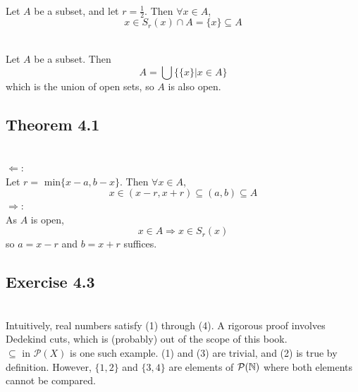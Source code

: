 \begin{solution}
 \\Let $A$ be a subset, and let $r = \frac{1}{2}$. Then $\forall x \in A$,
 $$x \in S_r(x) \cap A = \{x\} \subseteq A$$
\end{solution}


\begin{solution}
 \\Let $A$ be a subset. Then
 $$A = \bigcup\{\{x\}|x \in A\}$$
 which is the union of open sets, so $A$ is also open.
\end{solution}

\subsection{Theorem 4.1}


\begin{solution}
 \\$\Leftarrow$: \\
 Let $r =$ min$\{x-a,b-x\}$. Then $\forall x \in A$,
 $$x \in (x-r,x+r) \subseteq (a,b) \subseteq A$$
 $\Rightarrow$: \\
 As $A$ is open,
 $$x \in A \Rightarrow x \in S_r(x)$$
 so $a = x - r$ and $b = x + r$ suffices.
\end{solution}

\subsection{Exercise 4.3}


\begin{solution}
 \\Intuitively, real numbers satisfy (1) through (4). A rigorous proof involves Dedekind cuts, which is (probably) out of the scope of this book. \\
 $\subseteq$ in $\mathcal{P}(X)$ is one such example. (1) and (3) are trivial, and (2) is true by definition. However, $\{1,2\}$ and $\{3,4\}$ are elements of $\mathcal{P}(\mathbb{N})$ where both elements cannot be compared.
\end{solution}

